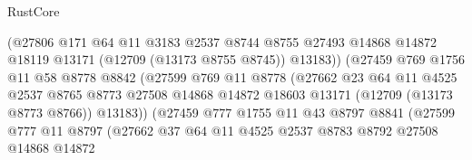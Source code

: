 \begin{lexlean}{RustCore}
\begin{coremodule}
                                (@27806
                                  @171
                                  @64
                                  @11
                                  @3183
                                  @2537
                                  @8744
                                  @8755
                                  @27493
                                  @14868
                                  @14872
                                  @18119
                                  @13171
                                  (@12709 (@13173 @8755 @8745))
                                  @13183))
                              (@27459
                                @769
                                @1756
                                @11
                                @58
                                @8778
                                @8842
                                (@27599
                                  @769
                                  @11
                                  @8778
                                  (@27662
                                    @23
                                    @64
                                    @11
                                    @4525
                                    @2537
                                    @8765
                                    @8773
                                    @27508
                                    @14868
                                    @14872
                                    @18603
                                    @13171
                                    (@12709 (@13173 @8773 @8766))
                                    @13183))
                                (@27459
                                  @777
                                  @1755
                                  @11
                                  @43
                                  @8797
                                  @8841
                                  (@27599
                                    @777
                                    @11
                                    @8797
                                    (@27662
                                      @37
                                      @64
                                      @11
                                      @4525
                                      @2537
                                      @8783
                                      @8792
                                      @27508
                                      @14868
                                      @14872

\end{coremodule}
\end{lexlean}
